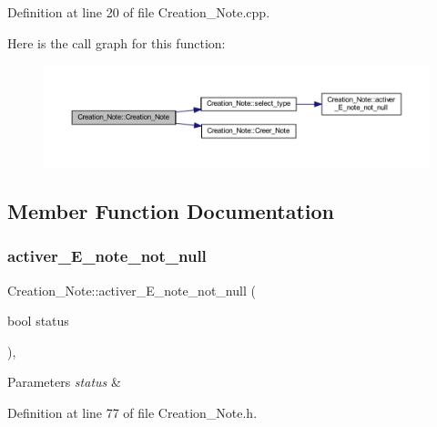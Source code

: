 Definition at line 20 of file Creation\+\_\+\+Note.\+cpp.

Here is the call graph for this function\+:\nopagebreak
\begin{figure}[H]
\begin{center}
\leavevmode
\includegraphics[width=350pt]{class_creation___note_a76278cf9f0de87cd61f204aafcebd5d2_cgraph}
\end{center}
\end{figure}


\subsection{Member Function Documentation}
\mbox{\label{class_creation___note_ad786b2c2e3273160009e560a8de2ab6c}} 
\subsubsection{\texorpdfstring{activer\+\_\+\+E\+\_\+note\+\_\+not\+\_\+null}{activer\_E\_note\_not\_null}}
{\footnotesize\ttfamily Creation\+\_\+\+Note\+::activer\+\_\+\+E\+\_\+note\+\_\+not\+\_\+null (\begin{DoxyParamCaption}\item[{bool}]{status }\end{DoxyParamCaption})\hspace{0.3cm}{\ttfamily [inline]}, {\ttfamily [slot]}}


\begin{DoxyParams}{Parameters}
{\em status} & \\
\hline
\end{DoxyParams}


Definition at line 77 of file Creation\+\_\+\+Note.\+h.

